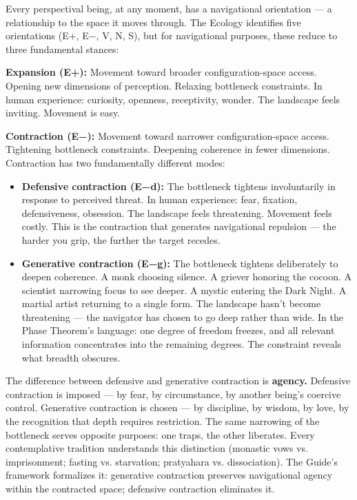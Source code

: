 Every perspectival being, at any moment, has a navigational orientation — a relationship to the space it moves through. The Ecology identifies five orientations (E+, E−, V, N, S), but for navigational purposes, these reduce to three fundamental stances:


\textbf{Expansion (E+):} Movement toward broader configuration-space access. Opening new dimensions of perception. Relaxing bottleneck constraints. In human experience: curiosity, openness, receptivity, wonder. The landscape feels inviting. Movement is easy.


\textbf{Contraction (E−):} Movement toward narrower configuration-space access. Tightening bottleneck constraints. Deepening coherence in fewer dimensions. Contraction has two fundamentally different modes:


\begin{itemize}[nosep,leftmargin=*]
  \item \textbf{Defensive contraction (E−d):} The bottleneck tightens involuntarily in response to perceived threat. In human experience: fear, fixation, defensiveness, obsession. The landscape feels threatening. Movement feels costly. This is the contraction that generates navigational repulsion — the harder you grip, the further the target recedes.
  \item \textbf{Generative contraction (E−g):} The bottleneck tightens deliberately to deepen coherence. A monk choosing silence. A griever honoring the cocoon. A scientist narrowing focus to see deeper. A mystic entering the Dark Night. A martial artist returning to a single form. The landscape hasn't become threatening — the navigator has chosen to go deep rather than wide. In the Phase Theorem's language: one degree of freedom freezes, and all relevant information concentrates into the remaining degrees. The constraint reveals what breadth obscures.
\end{itemize}


The difference between defensive and generative contraction is \textbf{agency.} Defensive contraction is imposed — by fear, by circumstance, by another being's coercive control. Generative contraction is chosen — by discipline, by wisdom, by love, by the recognition that depth requires restriction. The same narrowing of the bottleneck serves opposite purposes: one traps, the other liberates. Every contemplative tradition understands this distinction (monastic vows vs. imprisonment; fasting vs. starvation; pratyahara vs. dissociation). The Guide's framework formalizes it: generative contraction preserves navigational agency within the contracted space; defensive contraction eliminates it.


